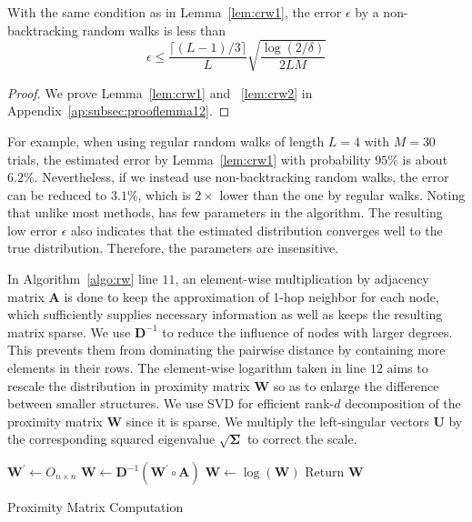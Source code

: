 \begin{lemma}  \label{lem:crw2}
With the same condition as in Lemma~\ref{lem:crw1}, the error $\epsilon$ by a non-backtracking random walks is less than
\begin{equation}
    \epsilon \leq \frac{\lceil (L - 1) / 3 \rceil}{L} \sqrt{\frac{\log{(2/\delta)}}{2LM}}
\end{equation}
\end{lemma}

\begin{proof}
We prove Lemma~\ref{lem:crw1} and ~\ref{lem:crw2} in Appendix~\ref{ap:subsec:prooflemma12}.
\end{proof}

For example, when using regular random walks of length $L=4$ with $M=30$ trials, the estimated error by Lemma~\ref{lem:crw1} with probability $95\%$ is about $6.2\%$. Nevertheless, if we instead use non-backtracking random walks, the error can be reduced to $3.1\%$, which is $2\times$ lower than the one by regular walks. Noting that unlike most methods, \method has few parameters in the algorithm. The resulting low error $\epsilon$ also indicates that the estimated distribution converges well to the true distribution. Therefore, the parameters are insensitive.

In Algorithm~\ref{algo:rw} line $11$, an element-wise multiplication by adjacency matrix ${\boldsymbol A}$ is done to keep the approximation of 1-hop neighbor for each node, which sufficiently supplies necessary information as well as keeps the resulting matrix sparse. 
We use ${\boldsymbol D}^{-1}$ to reduce the influence of nodes with larger degrees. This prevents them from dominating the pairwise distance by containing more elements in their rows. 
The element-wise logarithm taken in line $12$ aims to rescale the distribution in proximity matrix ${\boldsymbol W}$ so as to enlarge the difference between smaller structures.
We use SVD for efficient rank-$d$ decomposition of the proximity matrix ${\boldsymbol W}$ since it is sparse. We multiply the left-singular vectors ${\boldsymbol U}$ by the corresponding squared eigenvalue $\sqrt{{\boldsymbol \Sigma}}$ to correct the scale.


\begin{algorithm}[htbp]
\SetAlgoLined
\LinesNumbered
{}
${\boldsymbol W}^{'} \leftarrow O_{n \times n}$\;
${\boldsymbol W} \leftarrow {\boldsymbol D}^{-1}({\boldsymbol W}^{'} \circ {\boldsymbol A})$\;
${\boldsymbol W} \leftarrow \log{({\boldsymbol W})}$\textcolor{blue}{}
Return ${\boldsymbol W}$\;
\caption{Proximity Matrix Computation \label{algo:rw}}
\end{algorithm}

